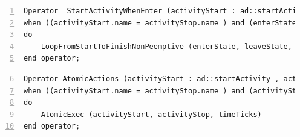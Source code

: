 \begin{lstlisting}[language=bcool,
caption={Hierarchical operator between TFSM and Activity languages},
label={lst:bcoolStartActivityWhenEnter}, 
basicstyle=\scriptsize\ttfamily, backgroundcolor=\color{LGrey}, numbers=left, xleftmargin=2pt]
Operator  StartActivityWhenEnter (activityStart : ad::startActivity , activityStop : ad::finishActivity, enterState : tfsm::entering, leaveState : tfsm::leaving)
when ((activityStart.name = activityStop.name ) and (enterState.name = leaveState.name) and (activityStart.name = enterState.onEnterAction.name));
do 
	LoopFromStartToFinishNonPeemptive (enterState, leaveState, activityStart, activityStop)
end operator;
\end{lstlisting}


\begin{lstlisting}[language=bcool,
caption={Timing Hierarchical operator between TFSM and Activity languages},
label={lst:bcoolAtomicExec}, 
basicstyle=\scriptsize\ttfamily, backgroundcolor=\color{LGrey}, numbers=left, xleftmargin=2pt, firstnumber=6]
Operator AtomicActions (activityStart : ad::startActivity , activityStop : ad::finishActivity, enterState : tfsm::entering, leaveState : tfsm::leaving, timeTicks : tfsm::ticks)
when ((activityStart.name = activityStop.name ) and (activityStart.name=enterState.OnEnterAction.name ) and (enterState.owningFSM.localClock = timeTicks));
do 
	AtomicExec (activityStart, activityStop, timeTicks)
end operator;
\end{lstlisting}




